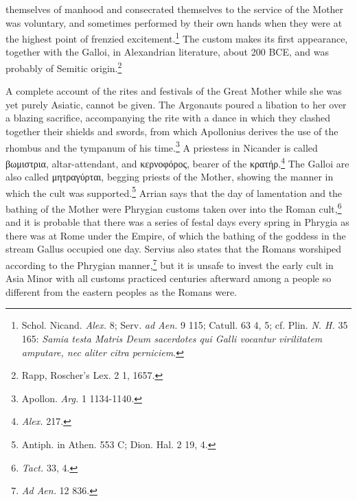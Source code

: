 \documentclass[a4paper, 11pt, oneside, polutonikogreek, english]{article}
\begin{document}
themselves of manhood and consecrated themselves to the service of the Mother was voluntary, and sometimes performed by their own hands when they were at the highest point of frenzied excitement.\footnote{Schol. Nicand. \emph{Alex.} 8; Serv. \emph{ad Aen.} 9 115; Catull. 63 4, 5; cf. Plin. \emph{N. H.} 35 165: \emph{Samia testa Matris Deum sacerdotes qui Galli vocantur virilitatem amputare, nec aliter citra perniciem}.} The custom makes its first appearance, together with the Galloi, in Alexandrian literature, about 200 \textsc{BCE}, and was probably of Semitic origin.\footnote{Rapp, Roscher's Lex. 2 1, 1657.}

A complete account of the rites and festivals of the Great Mother while she was yet purely Asiatic, cannot be given. The Argonauts poured a libation to her over a blazing sacrifice, accompanying the rite with a dance in which they clashed together their shields and swords, from which Apollonius derives the use of the rhombus and the tympanum of his time.\footnote{Apollon. \emph{Arg.} 1 1134-1140.} A priestess in Nicander is called βωμιστρια, altar-attendant, and κερνοφόρος, bearer of the κρατήρ.\footnote{\emph{Alex.} 217.} The Galloi are also called μητραγύρται, begging priests of the Mother, showing the manner in which the cult was supported.\footnote{Antiph. in Athen. 553 C; Dion. Hal. 2 19, 4.} Arrian says that the day of lamentation and the bathing of the Mother were Phrygian customs taken over into the Roman cult,\footnote{\emph{Tact.} 33, 4.} and it is probable that there was a series of festal days every spring in Phrygia as there was at Rome under the Empire, of which the bathing of the goddess in the stream Gallus occupied one day. Servius also states that the Romans worshiped according to the Phrygian manner,\footnote{\emph{Ad Aen.} 12 836.} but it is unsafe to invest the early cult in Asia Minor with all customs practiced centuries afterward among a people so different from the eastern peoples as the Romans were.
\end{document}
